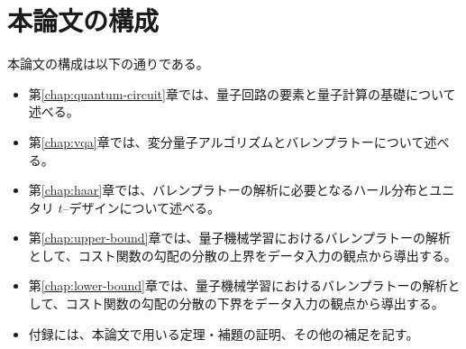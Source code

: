 \section{本論文の構成}
本論文の構成は以下の通りである。
\begin{itemize}
    \item 第\ref{chap:quantum-circuit}章では、量子回路の要素と量子計算の基礎について述べる。
    \item 第\ref{chap:vqa}章では、変分量子アルゴリズムとバレンプラトーについて述べる。
    \item 第\ref{chap:haar}章では、バレンプラトーの解析に必要となるハール分布とユニタリ $t$--デザインについて述べる。
    \item 第\ref{chap:upper-bound}章では、量子機械学習におけるバレンプラトーの解析として、コスト関数の勾配の分散の上界をデータ入力の観点から導出する。
    \item 第\ref{chap:lower-bound}章では、量子機械学習におけるバレンプラトーの解析として、コスト関数の勾配の分散の下界をデータ入力の観点から導出する。
    \item 付録には、本論文で用いる定理・補題の証明、その他の補足を記す。
\end{itemize}
